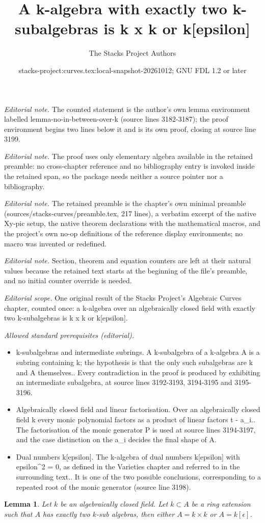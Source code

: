 \documentclass{stacks-project}
\title{A k-algebra with exactly two k-subalgebras is k x k or k[epsilon]}
\author{The Stacks Project Authors}
\date{stacks-project:curves.tex:local-snapshot-20261012; GNU FDL 1.2 or later}
\theoremstyle{plain}
\newtheorem{lemma}[subsection]{Lemma}
\theoremstyle{definition}
\theoremstyle{remark}
\numberwithin{equation}{subsection}
\begin{document}
\maketitle
\noindent\textit{Editorial note.} The counted statement is the author's own lemma environment labelled lemma-no-in-between-over-k (source lines 3182-3187); the proof environment begins two lines below it and is its own proof, closing at source line 3199.\par\medskip
\noindent\textit{Editorial note.} The proof uses only elementary algebra available in the retained preamble: no cross-chapter reference and no bibliography entry is invoked inside the retained span, so the package needs neither a source pointer nor a bibliography.\par\medskip
\noindent\textit{Editorial note.} The retained preamble is the chapter's own minimal preamble (sources/stacks-curves/preamble.tex, 217 lines), a verbatim excerpt of the native Xy-pic setup, the native theorem declarations with the mathematical macros, and the project's own no-op definitions of the reference display environments; no macro was invented or redefined.\par\medskip
\noindent\textit{Editorial note.} Section, theorem and equation counters are left at their natural values because the retained text starts at the beginning of the file's preamble, and no initial counter override is needed.\par\medskip
\noindent\textit{Editorial scope.} One original result of the Stacks Project's Algebraic Curves chapter, counted once: a k-algebra over an algebraically closed field with exactly two k-subalgebras is k x k or k[epsilon].\par\medskip
\noindent\textit{Allowed standard prerequisites (editorial).}\begin{itemize}
\item k-subalgebras and intermediate subrings. A k-subalgebra of a k-algebra A is a subring containing k; the hypothesis is that the only such subalgebras are k and A themselves.. Every contradiction in the proof is produced by exhibiting an intermediate subalgebra, at source lines 3192-3193, 3194-3195 and 3195-3196.
\item Algebraically closed field and linear factorisation. Over an algebraically closed field k every monic polynomial factors as a product of linear factors t - a\_i.. The factorisation of the monic generator P is used at source lines 3194-3197, and the case distinction on the a\_i decides the final shape of A.
\item Dual numbers k[epsilon]. The k-algebra of dual numbers k[epsilon] with epsilon\textasciicircum{}2 = 0, as defined in the Varieties chapter and referred to in the surrounding text.. It is one of the two possible conclusions, corresponding to a repeated root of the monic generator (source line 3198).
\end{itemize}\medskip
\begin{lemma}
\label{lemma-no-in-between-over-k}
Let $k$ be an algebraically closed field. Let $k \subset A$ be a ring
extension such that $A$ has exactly two $k$-sub algebras, then
either $A = k \times k$ or $A = k[\epsilon]$.
\end{lemma}
\end{document}
